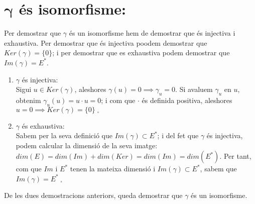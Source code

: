 \documentclass[a4paper, 12pt]{article}
\newcommand{\C}{\cdot}
\begin{document}
    \section{$\mathbf{\gamma}$ \'es isomorfisme:}
    Per demostrar que $\gamma$ \'es un isomorfisme hem de demostrar que \'es injectiva i exhaustiva. Per demostrar que \'es injectiva poodem demostrar que $Ker(\gamma) = \{0\}$; i per demostrar que es exhaustiva podem demostrar que $Im(\gamma) = E^*$.
    \begin{enumerate}
        \item $\gamma$ \'es injectiva:\\
              Sigui $u \in Ker(\gamma)$, aleshores $\gamma(u) = 0 \implies \gamma_u = 0$. Si avaluem $\gamma_u$ en $u$, obtenim $\gamma_u(u) = u \C u = 0$; i com que $\C$ \'es definida positiva, aleshores $u = 0 \implies Ker(\gamma) = \{ 0 \} \; _\square$\newpage
        \item $\gamma$ \'es exhaustiva:\\
              Sabem per la seva definici\'o que $Im(\gamma) \subset E^*$; i del fet que $\gamma$ \'es injectiva, podem calcular la dimensi\'o de la seva imatge: $dim(E) = dim(Im) + dim(Ker) = dim(Im) = dim(E^*)$. Per tant, com que $Im$ i $E^*$ tenen la mateixa dimensi\'o i $Im(\gamma) \subset E^*$, sabem que $Im (\gamma) = E^* \;_\square$
    \end{enumerate}
    De les dues demostracions anteriors, queda demostrar que $\gamma$ \'es un isomorfisme.
\end{document}
